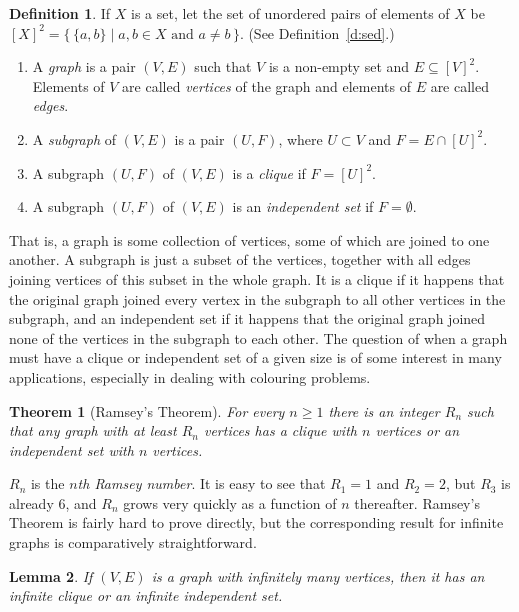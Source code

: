 \documentclass[12pt]{amsbook}
\theoremstyle{plain}
\newtheorem{thm}{Theorem}[chapter]
\newtheorem{lem}[thm]{Lemma}
\theoremstyle{definition}
\newtheorem{defn}{Definition}[chapter]
\theoremstyle{remark}
\begin{document}
\begin{defn}
If $X$ is a set,  let the set of unordered pairs of elements of $X$ be $[X]^2 = \{\, \{a,b\} \mid a,b \in X \text{\ and\ } a \ne b \,\}$.  (See Definition~\ref{d:sed}.)
\begin{enumerate}
\item A {\em graph\/}  is a pair $(V,E)$ such that $V$ is a non-empty set and $E \subseteq [V]^2$.  Elements of $V$ are called {\em vertices\/} of the graph and elements of $E$ are called {\em edges\/}.
\item A {\em subgraph\/} of $(V,E)$ is a pair $(U,F)$,  where $U \subset V$ and $F = E \cap [U]^2$.
\item A subgraph $(U,F)$ of $(V,E)$ is a {\em clique\/} if $F = [U]^2$.
\item A subgraph $(U,F)$ of $(V,E)$ is an {\em independent set\/} if $F = \emptyset$.
\end{enumerate}
\end{defn}

That is,  a graph is some collection of vertices,  some of which are joined to one another.  A subgraph is just a subset of the vertices,  together with all edges joining vertices of this subset in the whole graph.  It is a clique if it happens that the original graph joined every vertex in the subgraph to all other vertices in the subgraph,  and an independent set if it happens that the original graph joined none of the vertices in the subgraph to each other.  The question of when a graph must have a clique or independent set of a given size is of some interest in many applications,  especially in dealing with colouring problems.  

\begin{thm}[Ramsey's Theorem] \label{t:ram} 
For every $n \ge 1$ there is an integer $R_n$ such that any graph with at least $R_n$ vertices has a clique with $n$ vertices or an independent set with $n$ vertices.
\end{thm}

$R_n$ is the {\em $n$th Ramsey number\/}.  It is easy to see that $R_1 = 1$ and $R_2 = 2$,  but $R_3$ is already $6$,  and $R_n$ grows very quickly as a function of $n$ thereafter.  Ramsey's Theorem is fairly hard to prove directly,  but the corresponding result for infinite graphs is comparatively straightforward.

\begin{lem} \label{l:irt}  
If $(V,E)$ is a graph with infinitely many vertices,  then it has an infinite clique or an infinite independent set.
\end{lem}
\end{document}
